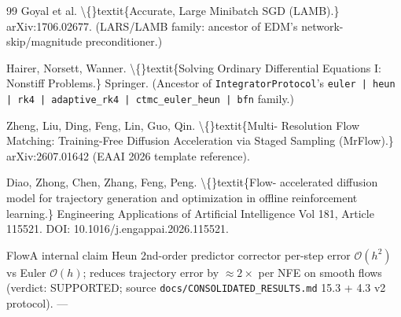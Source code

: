 \documentclass[preprint,3p,times,twocolumn]{elsarticle}
\begin{document}
\begin{thebibliography}{99}
 Goyal et al. \textbackslash\{\}textit\{Accurate, Large Minibatch SGD (LAMB).\} arXiv:1706.02677. (LARS/LAMB family: ancestor of EDM's network- skip/magnitude preconditioner.)

 Hairer, Norsett, Wanner. \textbackslash\{\}textit\{Solving Ordinary Differential Equations I: Nonstiff Problems.\} Springer. (Ancestor of \texttt{IntegratorProtocol}'s \texttt{euler | heun | rk4 | adaptive\_rk4 | ctmc\_euler\_heun | bfn} family.)

 Zheng, Liu, Ding, Feng, Lin, Guo, Qin. \textbackslash\{\}textit\{Multi- Resolution Flow Matching: Training-Free Diffusion Acceleration via Staged Sampling (MrFlow).\} arXiv:2607.01642 (EAAI 2026 template reference).

 Diao, Zhong, Chen, Zhang, Feng, Peng. \textbackslash\{\}textit\{Flow- accelerated diffusion model for trajectory generation and optimization in offline reinforcement learning.\} Engineering Applications of Artificial Intelligence Vol 181, Article 115521. DOI: 10.1016/j.engappai.2026.115521.

 FlowA internal claim  Heun 2nd-order predictor corrector per-step error $\mathcal{O}(h^2)$ vs Euler $\mathcal{O}(h)$; reduces trajectory error by $\approx 2\times$ per NFE on smooth flows (verdict: SUPPORTED; source \texttt{docs/CONSOLIDATED\_RESULTS.md} 15.3 + 4.3 v2 protocol). ---

\end{thebibliography}
\end{document}
